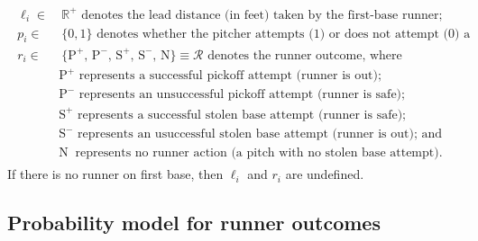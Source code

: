 \documentclass{article}
\begin{document}
    \begin{align}
    \label{eqn:runner-outcome}
      \begin{split}
        \ell_i  \in &~ \mathbb{R}^+ \mbox{ denotes the lead distance (in feet) taken by the first-base runner;}\\
        p_i \in &~ \{0, 1\} \mbox{ denotes whether the pitcher attempts (1) or does not attempt (0) a pickoff; and}\\
        r_i \in &~ \{\mbox{P}^+,\, \mbox{P}^-,\, \mbox{S}^+,\, \mbox{S}^-,\, \mbox{N}\} \equiv \mathcal{R} \mbox{ denotes the runner outcome, where}\\
          & \mbox{P}^+  \mbox{ represents a successful pickoff attempt (runner is out);}\\
          & \mbox{P}^-  \mbox{ represents an unsuccessful pickoff attempt (runner is safe);}\\
          & \mbox{S}^+  \mbox{ represents a successful stolen base attempt (runner is safe);}\\
          & \mbox{S}^-  \mbox{ represents an usuccessful stolen base attempt (runner is out); and}\\
          & \mbox{N}~   \mbox{ represents no runner action (a pitch with no stolen base attempt).}
      \end{split}
    \end{align}
    If there is no runner on first base, then $\ell_i$ and $r_i$ are undefined.%

    \subsection{Probability model for runner outcomes}
    \label{sec:prob-runner-outcome}
\end{document}
